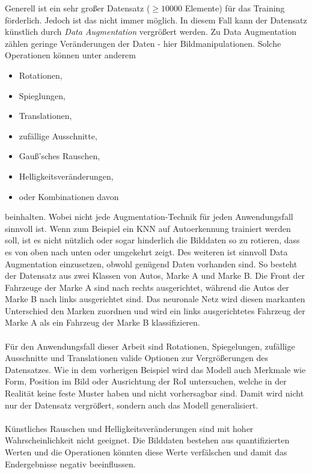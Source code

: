 Generell ist ein sehr großer Datensatz ($\ge10000$ Elemente) für das Training förderlich. Jedoch ist das nicht immer möglich. In diesem Fall kann der Datensatz künstlich durch \textit{Data Augmentation} vergrößert werden. Zu Data Augmentation zählen geringe Veränderungen der Daten - hier Bildmanipulationen. Solche Operationen können unter anderem
\begin{itemize}
	\item Rotationen,
	\item Spieglungen,
	\item Translationen,
	\item zufällige Ausschnitte,
	\item Gauß'sches Rauschen,
	\item Helligkeitsveränderungen,
	\item oder Kombinationen davon
\end{itemize}
beinhalten. Wobei nicht jede Augmentation-Technik für jeden Anwendungsfall sinnvoll ist. Wenn zum Beispiel ein KNN auf Autoerkennung trainiert werden soll, ist es nicht nützlich oder sogar hinderlich die Bilddaten so zu rotieren, dass es von oben nach unten oder umgekehrt zeigt. Des weiteren ist sinnvoll Data Augmentation einzusetzen, obwohl genügend Daten vorhanden sind. So besteht der Datensatz aus zwei Klassen von Autos, Marke A und Marke B. Die Front der Fahrzeuge der Marke A sind nach rechts ausgerichtet, während die Autos der Marke B nach links ausgerichtet sind. Das neuronale Netz wird diesen markanten Unterschied den Marken zuordnen und wird ein links ausgerichtetes Fahrzeug der Marke A als ein Fahrzeug der Marke B klassifizieren.\cite{ref:augmentation}
\\\\
Für den Anwendungsfall dieser Arbeit sind Rotationen, Spiegelungen, zufällige Ausschnitte und Translationen valide Optionen zur Vergrößerungen des Datensatzes. Wie in dem vorherigen Beispiel wird das Modell auch Merkmale wie Form, Position im Bild oder Ausrichtung der RoI untersuchen, welche in der Realität keine feste Muster haben und nicht vorhersagbar sind. Damit wird nicht nur der Datensatz vergrößert, sondern auch das Modell generalisiert.
\\\\
Künstliches Rauschen und Helligkeitsveränderungen sind mit hoher Wahrscheinlichkeit nicht geeignet. Die Bilddaten bestehen aus quantifizierten Werten und die Operationen könnten diese Werte verfälschen und damit das Endergebnisse negativ beeinflussen.

